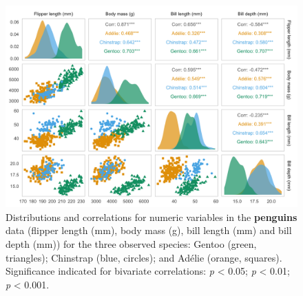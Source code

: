 \begin{Schunk}
\begin{figure}

{\centering \includegraphics[width=\textwidth]{figs/penguin-pairs-1} 

}

\caption{Distributions and correlations for numeric variables in the \textbf{penguins} data (flipper length (mm), body mass (g), bill length (mm) and bill depth (mm)) for the three observed species: Gentoo (green, triangles); Chinstrap (blue, circles); and Adélie (orange, squares). Significance indicated for bivariate correlations: \text{*}\textit{p} < 0.05; \text{*}\text{*}\textit{p} < 0.01; \text{*}\text{*}\text{*}\textit{p} < 0.001.}\label{fig:penguin-pairs}
\end{figure}
\end{Schunk}

